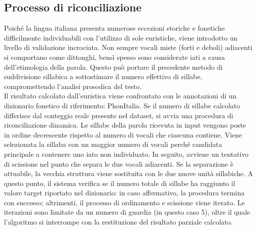 \subsection{Processo di riconciliazione}
Poiché la lingua italiana presenta numerose eccezioni storiche e fonetiche difficilmente individuabili con l'utilizzo di sole euristiche, 
viene introdotto un livello di validazione incrociata. Non sempre vocali miste (forti e deboli) adiacenti si comportano come dittonghi, bensì spesso 
sono considerate iati a causa dell'etimologia della parola. Questo può portare il precedente metodo 
di suddivisione sillabica a sottostimare il numero effettivo di sillabe, compromettendo l'analisi prosodica del testo.\\  
Il risultato calcolato dall'euristica viene confrontato con le annotazioni di un dizionario fonetico di riferimento: PhonItalia. 
Se il numero di sillabe calcolato differisce dal conteggio reale presente nel dataset, si avvia una procedura di riconciliazione dinamica.
Le sillabe della parola ricevuta in input vengono poste in ordine decrescente rispetto al numero di vocali che ciascuna contiene. Viene selezionata 
la sillaba con un maggior numero di vocali perché candidata principale a contenere uno iato non individuato. In seguito, avviene un tentativo di scissione 
nel punto che separa le due vocali adiacenti. Se la separazione è attuabile, la vecchia struttura viene sostituita con le due nuove unità sillabiche. 
A questo punto, il sistema verifica se il numero totale di sillabe ha raggiunto il valore target riportato nel dizionario: in caso affermativo, la procedura 
termina con successo; altrimenti, il processo di ordinamento e scissione viene iterato. Le iterazioni sono limitate da un numero di guardia (in questo caso 5), 
oltre il quale l'algoritmo si interrompe con la restituzione del risultato parziale calcolato.

